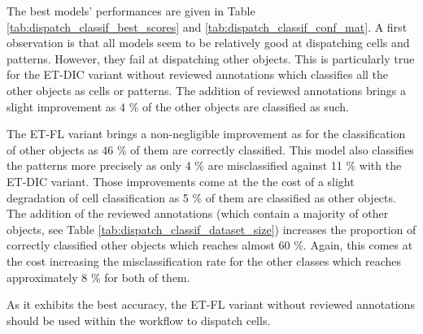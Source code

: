 The best models' performances are given in Table \ref{tab:dispatch_classif_best_scores} and \ref{tab:dispatch_classif_conf_mat}. A first observation is that all models seem to be relatively good at dispatching cells and patterns. However, they fail at dispatching other objects. This is particularly true for the ET-DIC variant without reviewed annotations which classifies all the other objects as cells or patterns. The addition of reviewed annotations brings a slight improvement as 4 \% of the other objects are classified as such.

The ET-FL variant brings a non-negligible improvement as for the classification of other objects as 46 \% of them are correctly classified. This model also classifies the patterns more precisely as only 4 \% are misclassified against 11 \% with the ET-DIC variant. Those improvements come at the the cost of a slight degradation of cell classification as 5 \% of them are classified as other objects. The addition of the reviewed annotations (which contain a majority of other objects, see Table \ref{tab:dispatch_classif_dataset_size}) increases the proportion of correctly classified other objects which reaches almost 60 \%. Again, this comes at the cost increasing the misclassification rate for the other classes which reaches approximately 8 \% for both of them.

As it exhibits the best accuracy, the ET-FL variant without reviewed annotations should be used within the workflow to dispatch cells.


